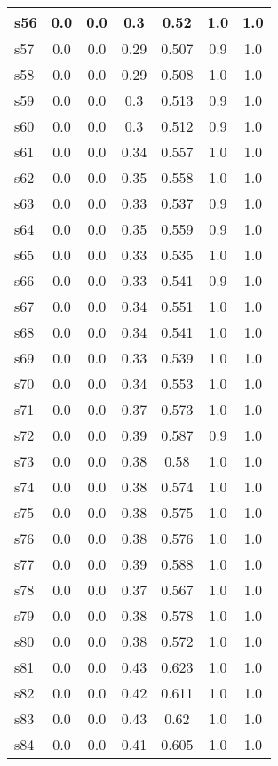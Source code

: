 \documentclass{article}
\begin{document}
\begin{tabular}{|l|c|c|c|c|c|c|}
\hline
s56 &0.0 & 0.0 & 0.3 & 0.52 & 1.0 & 1.0\\
\hline
s57 &0.0 & 0.0 & 0.29 & 0.507 & 0.9 & 1.0\\
\hline
s58 &0.0 & 0.0 & 0.29 & 0.508 & 1.0 & 1.0\\
\hline
s59 &0.0 & 0.0 & 0.3 & 0.513 & 0.9 & 1.0\\
\hline
s60 &0.0 & 0.0 & 0.3 & 0.512 & 0.9 & 1.0\\
\hline
s61 &0.0 & 0.0 & 0.34 & 0.557 & 1.0 & 1.0\\
\hline
s62 &0.0 & 0.0 & 0.35 & 0.558 & 1.0 & 1.0\\
\hline
s63 &0.0 & 0.0 & 0.33 & 0.537 & 0.9 & 1.0\\
\hline
s64 &0.0 & 0.0 & 0.35 & 0.559 & 0.9 & 1.0\\
\hline
s65 &0.0 & 0.0 & 0.33 & 0.535 & 1.0 & 1.0\\
\hline
s66 &0.0 & 0.0 & 0.33 & 0.541 & 0.9 & 1.0\\
\hline
s67 &0.0 & 0.0 & 0.34 & 0.551 & 1.0 & 1.0\\
\hline
s68 &0.0 & 0.0 & 0.34 & 0.541 & 1.0 & 1.0\\
\hline
s69 &0.0 & 0.0 & 0.33 & 0.539 & 1.0 & 1.0\\
\hline
s70 &0.0 & 0.0 & 0.34 & 0.553 & 1.0 & 1.0\\
\hline
s71 &0.0 & 0.0 & 0.37 & 0.573 & 1.0 & 1.0\\
\hline
s72 &0.0 & 0.0 & 0.39 & 0.587 & 0.9 & 1.0\\
\hline
s73 &0.0 & 0.0 & 0.38 & 0.58 & 1.0 & 1.0\\
\hline
s74 &0.0 & 0.0 & 0.38 & 0.574 & 1.0 & 1.0\\
\hline
s75 &0.0 & 0.0 & 0.38 & 0.575 & 1.0 & 1.0\\
\hline
s76 &0.0 & 0.0 & 0.38 & 0.576 & 1.0 & 1.0\\
\hline
s77 &0.0 & 0.0 & 0.39 & 0.588 & 1.0 & 1.0\\
\hline
s78 &0.0 & 0.0 & 0.37 & 0.567 & 1.0 & 1.0\\
\hline
s79 &0.0 & 0.0 & 0.38 & 0.578 & 1.0 & 1.0\\
\hline
s80 &0.0 & 0.0 & 0.38 & 0.572 & 1.0 & 1.0\\
\hline
s81 &0.0 & 0.0 & 0.43 & 0.623 & 1.0 & 1.0\\
\hline
s82 &0.0 & 0.0 & 0.42 & 0.611 & 1.0 & 1.0\\
\hline
s83 &0.0 & 0.0 & 0.43 & 0.62 & 1.0 & 1.0\\
\hline
s84 &0.0 & 0.0 & 0.41 & 0.605 & 1.0 & 1.0\\

\end{tabular}
\end{document}
